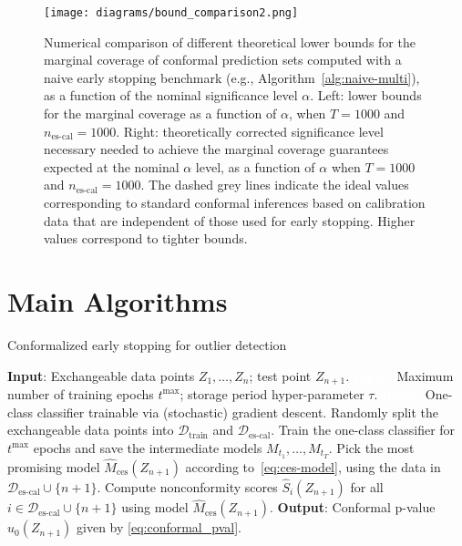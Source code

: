 \begin{figure}
    \centering
    \texttt{[image: diagrams/bound\_comparison2.png]}
    \caption{Numerical comparison of different theoretical lower bounds for the marginal coverage of conformal prediction sets computed with a naive early stopping benchmark (e.g., Algorithm~\ref{alg:naive-multi}), as a function of the nominal significance level $\alpha$. Left: lower bounds for the marginal coverage as a function of $\alpha$, when $T = 1000$ and $n_{\text{es-cal}}= 1000$.
Right: theoretically corrected significance level necessary needed to achieve the marginal coverage guarantees expected at the nominal $\alpha$ level, as a function of $\alpha$ when $T = 1000$ and $n_{\text{es-cal}}= 1000$. The dashed grey lines indicate the ideal values corresponding to standard conformal inferences based on calibration data that are independent of those used for early stopping. Higher values correspond to tighter bounds.
}
    \label{fig:bound_alpha}
\end{figure}


\section{Main Algorithms} \label{app:algorithms}

\begin{algorithm}[H]
    \caption{Conformalized early stopping for outlier detection}
    \label{alg:od_full_seq}
    \begin{algorithmic}[1]
        \STATE \textbf{Input}: Exchangeable data points $Z_1, \ldots, Z_n$; test point $Z_{n+1}$.
        \STATE \textcolor{white}{\textbf{Input}:} Maximum number of training epochs $t^{\text{max}}$; storage period hyper-parameter $\tau$.
        \STATE \textcolor{white}{\textbf{Input}:} One-class classifier trainable via (stochastic) gradient descent.
        \STATE Randomly split the exchangeable data points into $\mathcal{D}_{\text{train}}$ and $\mathcal{D}_{\text{es-cal}}$.
        \STATE Train the one-class classifier for $t^{\text{max}}$ epochs and save the intermediate models $M_{t_1} , \dots, M_{t_T}$.
        \STATE Pick the most promising model $\hat{M}_{\text{ces}}(Z_{n+1})$ according to~\eqref{eq:ces-model}, using the data in $\mathcal{D}_{\text{es-cal}} \cup \{n+1\}$.
        \STATE Compute nonconformity scores $\hat{S}_i(Z_{n+1})$ for all $i \in \mathcal{D}_{\text{es-cal}} \cup \{n+1\}$ using model $\hat{M}_{\text{ces}}(Z_{n+1})$.
        \STATE \textbf{Output}: Conformal p-value $\hat{u}_0(Z_{n+1})$ given by \eqref{eq:conformal_pval}.
    \end{algorithmic}
\end{algorithm}

